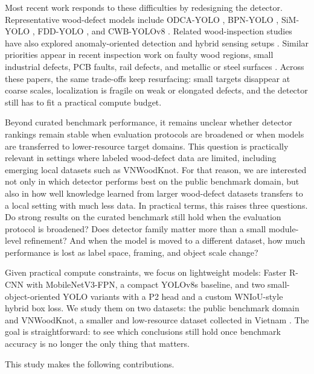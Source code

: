 \documentclass[10pt,a4paper]{article}
\begin{document}
Most recent work responds to these difficulties by redesigning the detector. Representative wood-defect models include ODCA-YOLO \citep{odca_yolo}, BPN-YOLO \citep{bpn_yolo}, SiM-YOLO \citep{sim_yolo}, FDD-YOLO \citep{fdd_yolo}, and CWB-YOLOv8 \citep{an_cwb_yolov8}. Related wood-inspection studies have also explored anomaly-oriented detection and hybrid sensing setups \citep{kilic_2024,kilic_2025_wd_detector}. Similar priorities appear in recent inspection work on faulty wood regions, small industrial defects, PCB faults, rail defects, and metallic or steel surfaces \citep{cmc_wood_area_attention,cmc_insulator_small,cmc_pcb_yolov8,cmc_cg_yolov8,cmc_rail_upernet,cmc_yolo_rlc,cmc_lmvit,cmc_msese,cmc_flame,cmc_channel_shuffle}. Across these papers, the same trade-offs keep resurfacing: small targets disappear at coarse scales, localization is fragile on weak or elongated defects, and the detector still has to fit a practical compute budget.


Beyond curated benchmark performance, it remains unclear whether detector rankings remain stable when evaluation protocols are broadened or when models are transferred to lower-resource target domains. This question is practically relevant in settings where labeled wood-defect data are limited, including emerging local datasets such as VNWoodKnot. For that reason, we are interested not only in which detector performs best on the public benchmark domain, but also in how well knowledge learned from larger wood-defect datasets transfers to a local setting with much less data. In practical terms, this raises three questions. Do strong results on the curated benchmark still hold when the evaluation protocol is broadened? Does detector family matter more than a small module-level refinement? And when the model is moved to a different dataset, how much performance is lost as label space, framing, and object scale change?

Given practical compute constraints, we focus on lightweight models: Faster R-CNN with MobileNetV3-FPN, a compact YOLOv8s baseline, and two small-object-oriented YOLO variants with a P2 head and a custom WNIoU-style hybrid box loss. We study them on two datasets: the public benchmark domain \citep{kodytek_dataset} and VNWoodKnot, a smaller and low-resource dataset collected in Vietnam \citep{TRAN2025112039}. The goal is straightforward: to see which conclusions still hold once benchmark accuracy is no longer the only thing that matters.

This study makes the following contributions.
\end{document}
